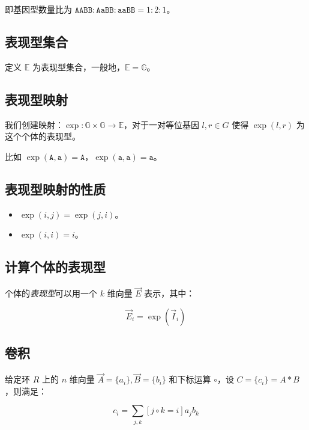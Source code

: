 \documentclass{article}
\begin{document}
即基因型数量比为 $\texttt{AABB} : \texttt{AaBB} : \texttt{aaBB}=1:2:1$。

\subsection{表现型集合}

定义 $\mathbb{E}$ 为表现型集合，一般地，$\mathbb{E}=\mathbb{G}$。

\subsection{表现型映射}

我们创建映射：$\operatorname{exp}:\mathbb{G} \times \mathbb{G} \to \mathbb{E}$，对于一对等位基因 $l,r \in G$ 使得 $\operatorname{exp}(l,r)$ 为这个个体的表现型。


比如 $\operatorname{exp}(\texttt{A},\texttt{a})=\texttt{A}$，$\operatorname{exp}(\texttt{a},\texttt{a})=\texttt{a}$。

\subsection{表现型映射的性质}

\begin{itemize}
    \item $\operatorname{exp}(i,j)=\operatorname{exp}(j,i)$。
    \item $\operatorname{exp}(i,i)=i$。
\end{itemize}

\subsection{计算个体的表现型}

个体的\textsl{表现型}可以用一个 $k$ 维向量 $\vec E$ 表示，其中：

$$\vec E_i=\operatorname{exp}(\vec I_i)$$

\subsection{卷积}

给定环 $R$ 上的 $n$ 维向量 $\vec A=\{a_i\},\vec B=\{b_i\}$ 和下标运算 $\circ$，设 $C=\{c_i\}=A*B$，则满足：

\begin{equation*}
    c_i=\sum_{j,k} [j \circ k=i] a_jb_k
\end{equation*}
\end{document}
